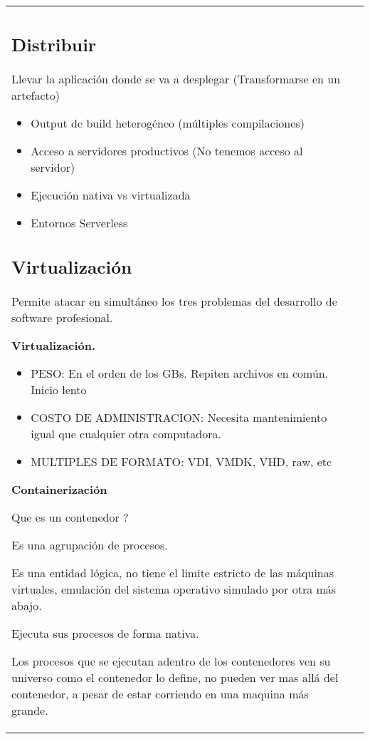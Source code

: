 \documentclass[letterpaper,11pt]{article}
\begin{document}
\begin{tabular*}{7in}{l@{\extracolsep{\fill}}r}
    \subsection{Distribuir}
    Llevar la aplicación donde se va a desplegar (Transformarse en un artefacto)
    
    \begin{itemize}
        \item Output de build heterogéneo (múltiples compilaciones)
        \item Acceso a servidores productivos (No tenemos acceso al servidor)
        \item Ejecución nativa vs virtualizada
        \item Entornos Serverless
    \end{itemize}
    
    \subsection{Virtualización}
    
    Permite atacar en simultáneo los tres problemas del desarrollo de software profesional.\par
    
    {\bf Virtualización.}\par
    \begin{itemize}
        \item PESO: En el orden de los GBs. Repiten archivos en común. Inicio lento
        \item COSTO DE ADMINISTRACION: Necesita mantenimiento igual que cualquier otra computadora.
        \item MULTIPLES DE FORMATO: VDI, VMDK, VHD, raw, etc
    \end{itemize}
    
    {\bf Containerización}\par
    
    Que es un contenedor ?

    Es una agrupación de procesos.
    
    Es una entidad lógica, no tiene el limite estricto de las máquinas virtuales, emulación del sistema operativo simulado por otra más abajo.
    
    Ejecuta sus procesos de forma nativa.
    
    Los procesos que se ejecutan adentro de los contenedores ven su universo como el contenedor lo define, no pueden ver mas allá del contenedor, a pesar de estar corriendo en una maquina más grande.
    

\end{tabular*}
\end{document}
